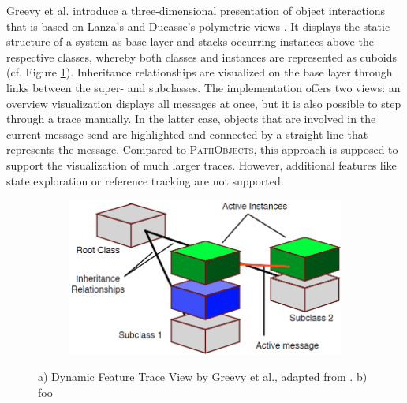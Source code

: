 Greevy et al. introduce a three-dimensional presentation of object interactions \cite{greevy_visualizing_2006} that is based on Lanza's and Ducasse's polymetric views \cite{lanza_polymetric_2003}.
It displays the static structure of a system as base layer and stacks occurring instances above the respective classes, whereby both classes and instances are represented as cuboids (cf. Figure \ref{fig:3DGreevy}).
Inheritance relationships are visualized on the base layer through links between the super- and subclasses.
The implementation offers two views: an overview visualization displays all messages at once, but it is also possible to step through a trace manually.
In the latter case, objects that are involved in the current message send are highlighted and connected by a straight line that represents the message.
Compared to \textsc{PathObjects}, this approach is supposed to support the visualization of much larger traces.
However, additional features like state exploration or reference tracking are not supported.

\begin{figure}[tb]
	\centering
	
	\begin{subfigure}[b]{0.45\textwidth}
		\centering
        \includegraphics[width=\textwidth]{../images/06-Greevy-3D}
        \caption[Dynamic Feature Trace View by Greevy et al.]{}
		\label{fig:3DGreevy}
	\end{subfigure}
	\quad
	\begin{subfigure}[b]{0.45\textwidth}
		\centering
		\caption[foo]{}
		\label{fig:3DBohnet}
	\end{subfigure}
	
	\caption[TOC Caption]{
		a) Dynamic Feature Trace View by Greevy et al., adapted from \cite{greevy_visualizing_2006}.
		b) foo
	}
\end{figure}

